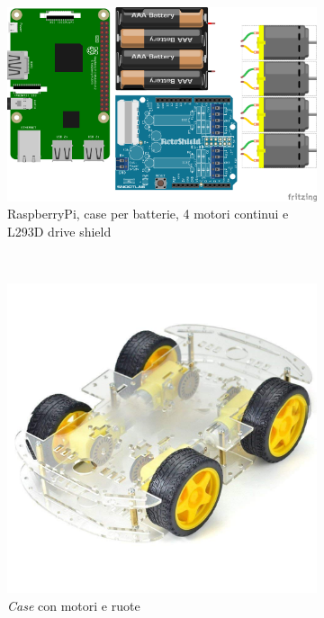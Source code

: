 \documentclass[11pt]{article}
\begin{document}
\begin{figure}[htp]
				\centering
		\begin{subfigure}[b]{0.6\textwidth}

		\includegraphics[width=\textwidth]{images/componentsROVIS.png}
		\caption{RaspberryPi, case per batterie, 4 motori continui e L293D drive shield}
		\label{fig:components}
	\end{subfigure}
\\
	\begin{subfigure}[b]{0.4\textwidth}
		
		\includegraphics[width=\textwidth]{images/car.jpg}
		\caption{\textit{Case} con motori e ruote}
	\label{fig:car}
	\end{subfigure}
	\begin{subfigure}[b]{0.4\textwidth}
		

\end{subfigure}
\end{figure}
\end{document}
